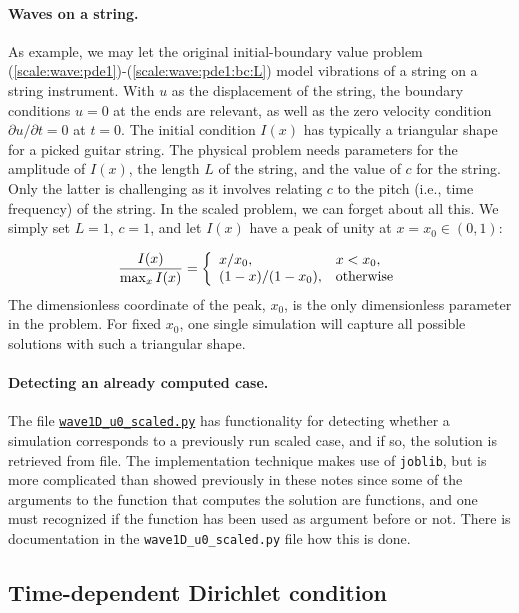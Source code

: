 \documentclass[graybox,envcountchap,sectrefs,final]{svmonodo}
\begin{document}
\paragraph{Waves on a string.}
As example, we may let the original initial-boundary value problem
(\ref{scale:wave:pde1})-(\ref{scale:wave:pde1:bc:L}) model vibrations of
a string on a string instrument. With $u$ as the displacement of the
string, the boundary conditions $u=0$ at the ends are relevant, as
well as the zero velocity condition $\partial u/\partial t=0$ at
$t=0$.  The initial condition $I(x)$ has typically a triangular shape
for a picked guitar string.  The physical problem needs parameters for
the amplitude of $I(x)$, the length $L$ of the string, and the value
of $c$ for the string. Only the latter is challenging as it involves
relating $c$ to the pitch (i.e., time frequency) of the string. In the
scaled problem, we can forget about all this. We simply set $L=1$,
$c=1$, and let $I(x)$ have a peak of unity at $x=x_0\in(0,1)$:

\[
\frac{I(x)}{\max_x I(x)} = \left\lbrace
\begin{array}{ll}
x/x_0, & x < x_0,\\ 
(1-x)/(1-x_0), & \hbox{otherwise}
\end{array}\right.
\]
The dimensionless coordinate of the peak, $x_0$, is the only
dimensionless parameter in the problem. For fixed $x_0$,
one single simulation will capture all possible solutions with such
a triangular shape.


\paragraph{Detecting an already computed case.}
The file \href{{http://tinyurl.com/o8pb3yy/wave1D_u0_scaled.py}}{\nolinkurl{wave1D_u0_scaled.py}}
has functionality for detecting whether a simulation corresponds to
a previously run scaled case, and if so, the solution is retrieved from
file. The implementation technique makes use of \texttt{joblib}, but is more
complicated than showed previously in these notes since some of the
arguments to the function that computes the solution are functions,
and one must recognized if the function has been used as argument
before or not. There is documentation in the \Verb!wave1D_u0_scaled.py!
file how this is done.


\subsection{Time-dependent Dirichlet condition}
\label{scale:wave:pde2}
\end{document}
